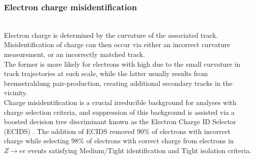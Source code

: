 \documentclass[../thesis.tex]{subfiles}
\begin{document}
\subsubsection*{Electron charge misidentification}
\citep{reco:electron_id}\citep{reco:qmisid_cnn}\\
Electron charge is determined by the curvature of the associated track. Misidentification of charge can then occur via either an incorrect curvature measurement, or an incorrectly matched track.\\
The former is more likely for electrons with high \pT due to the small curvature in track trajectories at such scale, while the latter usually results from bremsstrahlung pair-production, creating additional secondary tracks in the vicinity.\\
Charge misidentification is a crucial irreducible background for analyses with charge selection criteria, and suppression of this background is assisted via a boosted decision tree discriminant known as the Electron Charge ID Selector (ECIDS) \citep{reco:electron_id}. The addition of ECIDS removed 90\% of electrons with incorrect charge while selecting 98\% of electrons with correct charge from electrons in $Z\rightarrow ee$ events satisfying Medium/Tight identification and Tight isolation criteria.
\begin{figure}[!htbp]
\centering
{}
\caption{\label{fig:reco:electron_iso}\citep{reco:electron_meas}}
\end{figure}
\end{document}

